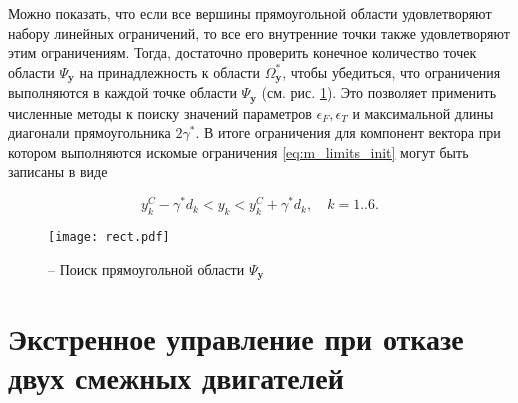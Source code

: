Можно показать, что если все вершины прямоугольной области удовлетворяют набору линейных ограничений, то все его внутренние точки также удовлетворяют этим ограничениям. Тогда, достаточно проверить конечное количество точек области $\Psi_{\bm y}$ на принадлежность к области $\Omega^*_{\bm y}$, чтобы убедиться, что ограничения выполняются в каждой точке области $\Psi_{\bm y}$ (см. рис. \ref{fig:reqct_finding}). Это позволяет применить численные методы к поиску значений параметров $\epsilon_F, \epsilon_T$ и максимальной длины диагонали прямоугольника $2\gamma^*$. В итоге ограничения для компонент вектора  при котором выполняются искомые ограничения \eqref{eq:m_limits_init} могут быть записаны в виде

\begin{equation} \label{eq:lims_final}
y^C_k - \gamma^* d_k < y_k < y^C_k + \gamma^* d_k, \quad k = 1 .. 6.
\end{equation}

\begin{figure}[h!]
	\centering
	\texttt{[image: rect.pdf]}
	\caption{ -- Поиск прямоугольной области $\Psi_{\boldsymbol{y}}$}
	\label{fig:reqct_finding}
\end{figure}

\section{Экстренное управление при отказе двух смежных двигателей}
\label{section_em_ctrl}

